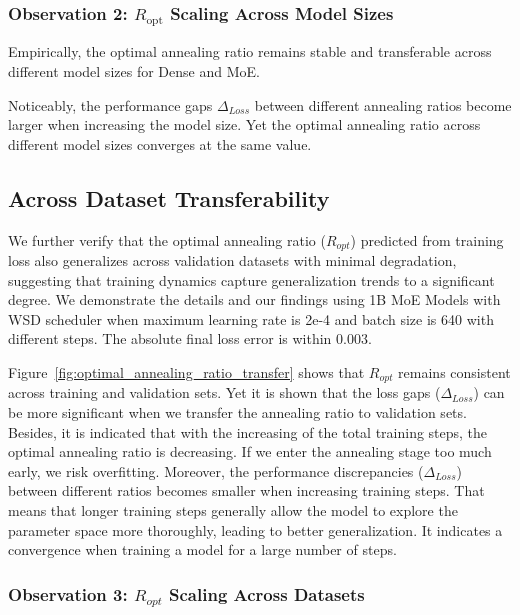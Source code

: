 \documentclass[letterpaper]{article} %
\begin{document}
\subsubsection*{Observation 2: $R_{\text{opt}}$ Scaling Across Model Sizes}

Empirically, the optimal annealing ratio remains stable and transferable across different model sizes for Dense and MoE.


Noticeably, the performance gaps \(\Delta_{Loss}\) between different annealing ratios become larger when increasing the model size. Yet the optimal annealing ratio across different model sizes converges at the same value.


\subsection{Across Dataset Transferability}
\label{sec:across_dataset_transfer}

We further verify that the optimal annealing ratio (\(R_{opt}\)) predicted from training loss also generalizes across validation datasets with minimal degradation, suggesting that training dynamics capture generalization trends to a significant degree. We demonstrate the details and our findings using 1B MoE Models with WSD scheduler when maximum learning rate is 2e-4 and batch size is 640 with different steps. The absolute final loss error is within 0.003. 


Figure~\ref{fig:optimal_annealing_ratio_transfer} shows that \(R_{opt}\) remains consistent across training and validation sets. Yet it is shown that the loss gaps (\(\Delta_{Loss}\)) can be more significant when we transfer the annealing ratio to validation sets. Besides, it is indicated that with the increasing of the total training steps, the optimal annealing ratio is decreasing. If we enter the annealing stage too much early, we risk overfitting. Moreover, the performance discrepancies (\(\Delta_{Loss}\)) between different ratios becomes smaller when increasing training steps. That means that longer training steps generally allow the model to explore the parameter space more thoroughly, leading to better generalization. It indicates a convergence when training a model for a large number of steps. 

\subsubsection*{Observation 3: $R_{opt}$ Scaling Across Datasets}
\end{document}
